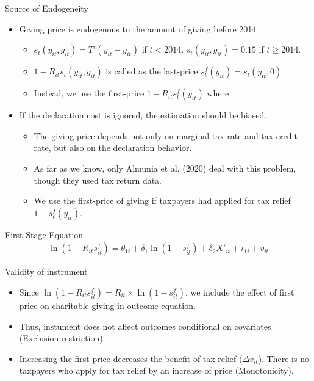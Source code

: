 \documentclass[
  ignorenonframetext,
  aspectratio=169,
]{beamer}
\providecommand{\tightlist}{%
  \setlength{\itemsep}{0pt}\setlength{\parskip}{0pt}}
\begin{document}
\begin{frame}{Source of Endogeneity}
\protect\hypertarget{source-of-endogeneity}{}
\begin{itemize}
\tightlist
\item
  Giving price is endogenous to the amount of giving before 2014

  \begin{itemize}
  \tightlist
  \item
    \(s_t(y_{it}, g_{it}) = T'(y_{it} - g_{it})\) if \(t < 2014\). \(s_t(y_{it}, g_{it}) = 0.15\) if \(t \ge 2014\).
  \item
    \(1 - R_{it} s_t(y_{it}, g_{it})\) is called as the last-price \(s^f_t(y_{it}) = s_t(y_{it}, 0)\)
  \item
    Instead, we use the first-price \(1 - R_{it} s^f_t(y_{it})\) where
  \end{itemize}
\item
  If the declaration cost is ignored, the estimation should be biased.

  \begin{itemize}
  \tightlist
  \item
    The giving price depends not only on marginal tax rate and tax credit rate, but also on the declaration behavior.
  \item
    As far as we know, only Almunia et al. (2020) deal with this problem, though they used tax return data.
  \item
    We use the first-price of giving if taxpayers had applied for tax relief \(1 - s^f_t(y_{it})\).
  \end{itemize}
\end{itemize}
\end{frame}

\begin{frame}{First-Stage Equation}
\protect\hypertarget{first-stage-equation}{}
\begin{align}
  \ln(1 - R_{it}s^f_{it})
  = \theta_{1i} + \delta_1 \ln(1 - s^f_{it}) + \delta_2 X'_{it} + \iota_{1i} + v_{it}
\end{align}

Validity of instrument

\begin{itemize}
\tightlist
\item
  Since \(\ln(1 - R_{it} s^f_{it}) = R_{it} \times \ln(1 - s^f_{it})\), we include the effect of first price on charitable giving in outcome equation.
\item
  Thus, instument does not affect outcomes conditional on covariates (Exclusion restriction)
\item
  Increasing the first-price decreases the benefit of tax relief (\(\Delta v_{it}\)). There is no taxpayers who apply for tax relief by an increase of price (Monotonicity).
\end{itemize}
\end{frame}
\end{document}
